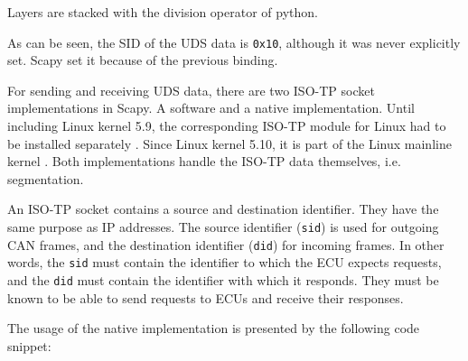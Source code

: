 Layers are stacked with the division operator of python.


As can be seen, the SID of the UDS data is \texttt{0x10}, although it was never explicitly set. Scapy set it because of the previous binding.

For sending and receiving UDS data, there are two ISO-TP socket implementations in Scapy. A software and a native implementation. Until including Linux kernel 5.9, the corresponding ISO-TP module for Linux had to be installed separately \cite{isotp-module}. Since Linux kernel 5.10, it is part of the Linux mainline kernel \cite{isotp-commit}. Both implementations handle the ISO-TP data themselves, i.e. segmentation.

An ISO-TP socket contains a source and destination identifier. They have the same purpose as IP addresses. The source identifier (\texttt{sid}) is used for outgoing CAN frames, and the destination identifier (\texttt{did}) for incoming frames. In other words, the \texttt{sid} must contain the identifier to which the ECU expects requests, and the \texttt{did} must contain the identifier with which it responds. They must be known to be able to send requests to ECUs and receive their responses.

The usage of the native implementation is presented by the following code snippet:


